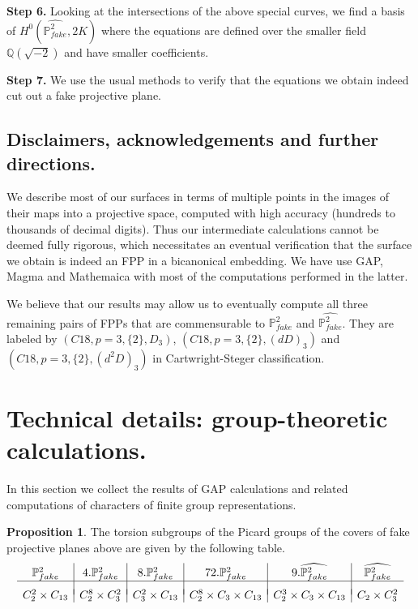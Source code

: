 \documentclass[11pt,reqno]{amsart}
\def\Q {{\mathbb Q}}
\def\P {{\mathbb P}}
\def\FPP {{\P^2_{fake}}}
\theoremstyle{definition}
\newtheorem{proposition}[theorem]{Proposition}
\numberwithin{equation}{section}
\begin{document}
\medskip
{\bf Step 6.} Looking at the intersections of the above special curves, we find a basis of $H^0(\widehat\FPP,2K)$ where the equations are defined over the smaller field $\Q(\sqrt{-2})$ 
and  have smaller coefficients.

\medskip
{\bf Step 7.} We use the usual methods to verify that the equations we obtain  indeed cut out a fake projective plane.

\subsection{Disclaimers, acknowledgements and further directions.}
We describe most of our surfaces in terms of multiple points in the images of  their maps into a projective space, computed with high accuracy (hundreds to thousands of decimal digits).
Thus our intermediate calculations cannot be deemed fully rigorous, which necessitates an eventual verification that the surface we obtain is indeed an FPP in a bicanonical embedding.
We have use GAP, Magma and Mathemaica \cite{GAP, Mag, Mat} with most of the computations performed in the latter.

\medskip
We believe that our results may allow us to eventually compute all three remaining pairs of FPPs that are commensurable to $\FPP$ and $\widehat\FPP$. They are labeled by
$(C18,p=3,\{2\},D_3)$,  $(C18,p=3,\{2\},(dD)_3)$ and $(C18,p=3,\{2\},(d^2D)_3)$ in Cartwright-Steger classification.

\section{Technical details: group-theoretic calculations.} 
In this section we collect the results of GAP calculations and related computations of characters of finite group representations.

\begin{proposition}\label{torsion}
The torsion subgroups of the Picard groups of the covers of fake projective planes above are given by the following table.
\begin{equation}
\begin{array}{c|c|c|c|c|c}
\FPP&4.\FPP &8.\FPP &72.\FPP&9.\widehat\FPP&\widehat\FPP\\
\hline&&&&&\\[-.5em]
     C_2^2\times C_{13} &   C_2^8\times C_3^2 &    C_3^2\times C_{13}         & C_2^8\times C_3\times C_{13}           &    C_2^3\times  C_3 \times C_{13}              & C_2 \times C_3^2
\end{array}
\end{equation}
\end{proposition}
\end{document}
